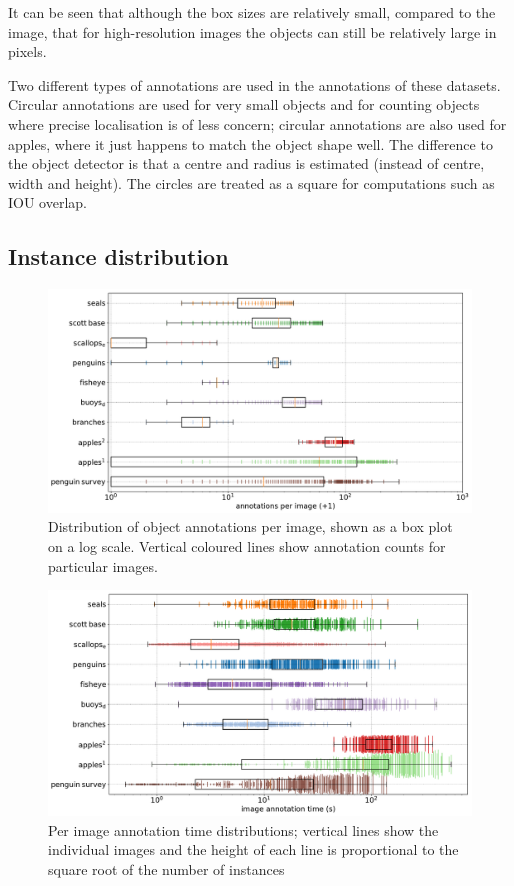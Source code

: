It can be seen that although the box sizes are relatively small, compared to the image, that for high-resolution images the objects can still be relatively large in pixels.

Two different types of annotations are used in the annotations of these datasets. Circular annotations are used for very small objects and for counting objects where precise localisation is of less concern; circular annotations are also used for apples, where it just happens to match the object shape well. The difference to the object detector is that a centre and radius is estimated (instead of centre, width and height). The circles are treated as a square for computations such as \gls{IOU} overlap.

\subsection {Instance distribution}

\begin{figure}[ht!]
\centering
\includegraphics[width=1.0\linewidth]{charts/summaries/instances_boxplot.pdf}
\caption{ Distribution of object annotations per image, shown as a box plot on a log scale. Vertical coloured lines show annotation counts for particular images. }
\label{fig:instances_image_plot}
\end{figure}

\begin{figure}[ht]
\centering
\includegraphics[width=1.0\linewidth]{charts/summaries/duration_boxplot.pdf}
\caption{ Per image annotation time distributions; vertical lines show the individual images and the height of each line is proportional to the square root of the number of instances }
\label{fig:duration_boxplot}
\end{figure}

